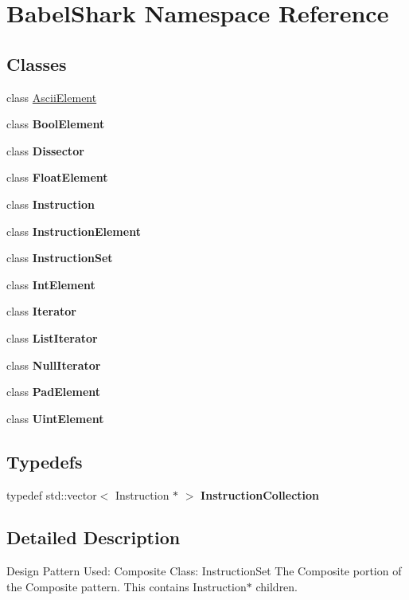 \hypertarget{namespace_babel_shark}{
\section{BabelShark Namespace Reference}
\label{namespace_babel_shark}
}
\subsection*{Classes}
\begin{CompactItemize}
\item 
class \hyperlink{class_babel_shark_1_1_ascii_element}{AsciiElement}
\item 
class \textbf{BoolElement}
\item 
class \textbf{Dissector}
\item 
class \textbf{FloatElement}
\item 
class \textbf{Instruction}
\item 
class \textbf{InstructionElement}
\item 
class \textbf{InstructionSet}
\item 
class \textbf{IntElement}
\item 
class \textbf{Iterator}
\item 
class \textbf{ListIterator}
\item 
class \textbf{NullIterator}
\item 
class \textbf{PadElement}
\item 
class \textbf{UintElement}
\end{CompactItemize}
\subsection*{Typedefs}
\begin{CompactItemize}
\item 
\hypertarget{namespace_babel_shark_b717a25ce0c899f2193ef8a7303a59bf}{
typedef std::vector$<$ Instruction $\ast$ $>$ \textbf{InstructionCollection}}
\label{namespace_babel_shark_b717a25ce0c899f2193ef8a7303a59bf}

\end{CompactItemize}


\subsection{Detailed Description}
Design Pattern Used: Composite Class: InstructionSet The Composite portion of the Composite pattern. This contains Instruction$\ast$ children. 

